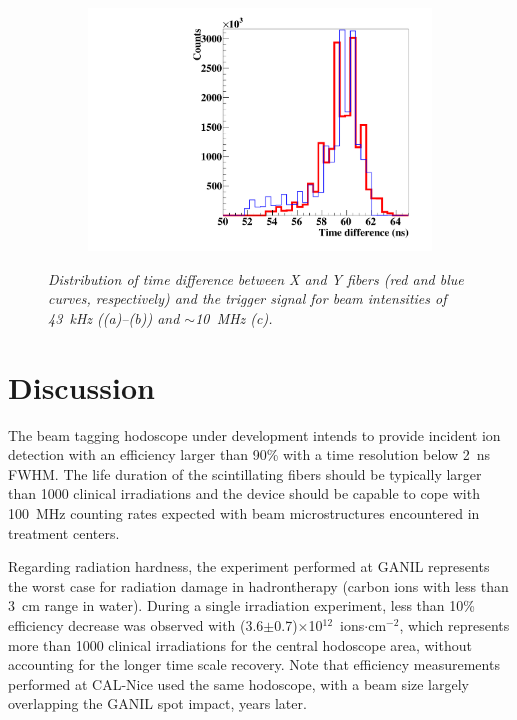 \documentclass[a4paper,11pt]{article}
\begin{document}
\begin{figure}[htb]
    \begin{subfigure}{0.3\textwidth} \centering \includegraphics[width=\textwidth]{figures/time_XY_10MHz_August.pdf} \caption{} \label{fig:Time_10MHz}
    \end{subfigure}
\caption{\small{\textit{Distribution of time difference between X and Y fibers (red and blue curves, respectively) and the trigger signal for beam intensities of 43~kHz ((a)--(b)) and $\sim$10~MHz (c).}}}
\label{fig:Time_coinc}
\end{figure}

\section{Discussion}

The beam tagging hodoscope under development intends to provide incident ion detection with an efficiency larger than 90\% with a time resolution below 2~ns FWHM. The life duration of the scintillating fibers should be typically larger than 1000 clinical irradiations and the device should be capable to cope with 100~MHz counting rates expected with beam microstructures encountered in treatment centers. 

Regarding radiation hardness, the experiment performed at GANIL represents the worst case for radiation damage in hadrontherapy (carbon ions with less than 3~cm range in water). During a single irradiation experiment, less than 10\% efficiency decrease was observed with (3.6$\pm$0.7)$\times$10$^{12}$~ions$\cdot$cm$^{-2}$, which represents more than 1000 clinical irradiations for the central hodoscope area, without accounting for the longer time scale recovery. Note that efficiency measurements performed at CAL-Nice used the same hodoscope, with a beam size largely overlapping the GANIL spot impact, years later.
\end{document}
